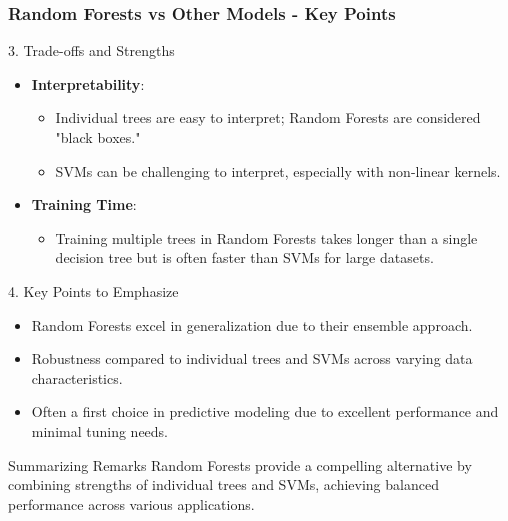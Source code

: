 \documentclass[aspectratio=169]{beamer}
\begin{document}
\begin{frame}[fragile]
  \frametitle{Random Forests vs Other Models - Key Points}

  \begin{block}{3. Trade-offs and Strengths}
    \begin{itemize}
      \item \textbf{Interpretability}:
      \begin{itemize}
        \item Individual trees are easy to interpret; Random Forests are considered "black boxes."
        \item SVMs can be challenging to interpret, especially with non-linear kernels.
      \end{itemize}
      \item \textbf{Training Time}:
      \begin{itemize}
        \item Training multiple trees in Random Forests takes longer than a single decision tree but is often faster than SVMs for large datasets.
      \end{itemize}
    \end{itemize}
  \end{block}

  \begin{block}{4. Key Points to Emphasize}
    \begin{itemize}
      \item Random Forests excel in generalization due to their ensemble approach.
      \item Robustness compared to individual trees and SVMs across varying data characteristics.
      \item Often a first choice in predictive modeling due to excellent performance and minimal tuning needs.
    \end{itemize}
  \end{block}
  
  \begin{block}{Summarizing Remarks}
    Random Forests provide a compelling alternative by combining strengths of individual trees and SVMs, achieving balanced performance across various applications.
  \end{block}
\end{frame}
\end{document}
